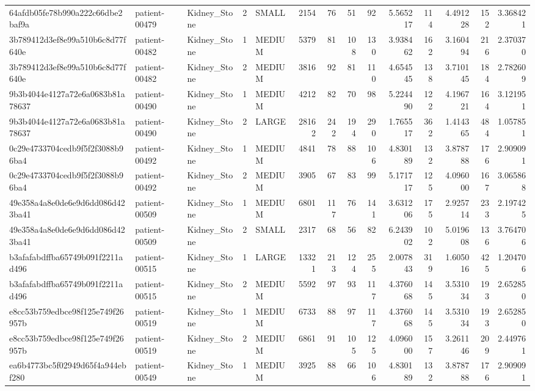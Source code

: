 \begin{tabular}{lllrlrrrrrrrrr}
64afdb05fe78b990a222c66dbe2baf9a & patient-00479 & Kidney_Stone & 2 & SMALL & 2154 & 76 & 51 & 92 & 5.565217 & 114 & 4.491228 & 152 & 3.368421 \\
3b789412d3ef8e99a510b6c8d77f640e & patient-00482 & Kidney_Stone & 1 & MEDIUM & 5379 & 81 & 108 & 130 & 3.938462 & 162 & 3.160494 & 216 & 2.370370 \\
3b789412d3ef8e99a510b6c8d77f640e & patient-00482 & Kidney_Stone & 2 & MEDIUM & 3816 & 92 & 81 & 110 & 4.654545 & 138 & 3.710145 & 184 & 2.782609 \\
9b3b4044e4127a72e6a0683b81a78637 & patient-00490 & Kidney_Stone & 1 & MEDIUM & 4212 & 82 & 70 & 98 & 5.224490 & 122 & 4.196721 & 164 & 3.121951 \\
9b3b4044e4127a72e6a0683b81a78637 & patient-00490 & Kidney_Stone & 2 & LARGE & 28162 & 242 & 194 & 290 & 1.765517 & 362 & 1.414365 & 484 & 1.057851 \\
0c29e4733704cedb9f5f2f3088b96ba4 & patient-00492 & Kidney_Stone & 1 & MEDIUM & 4841 & 78 & 88 & 106 & 4.830189 & 132 & 3.878788 & 176 & 2.909091 \\
0c29e4733704cedb9f5f2f3088b96ba4 & patient-00492 & Kidney_Stone & 2 & MEDIUM & 3905 & 67 & 83 & 99 & 5.171717 & 125 & 4.096000 & 167 & 3.065868 \\
49e358a4a8e0de6e9d6dd086d423ba41 & patient-00509 & Kidney_Stone & 1 & MEDIUM & 6801 & 117 & 76 & 141 & 3.631206 & 175 & 2.925714 & 233 & 2.197425 \\
49e358a4a8e0de6e9d6dd086d423ba41 & patient-00509 & Kidney_Stone & 2 & SMALL & 2317 & 68 & 56 & 82 & 6.243902 & 102 & 5.019608 & 136 & 3.764706 \\
b3afafabdffba65749b091f2211ad496 & patient-00515 & Kidney_Stone & 1 & LARGE & 13321 & 213 & 124 & 255 & 2.007843 & 319 & 1.605016 & 425 & 1.204706 \\
b3afafabdffba65749b091f2211ad496 & patient-00515 & Kidney_Stone & 2 & MEDIUM & 5592 & 97 & 93 & 117 & 4.376068 & 145 & 3.531034 & 193 & 2.652850 \\
e8cc53b759edbce98f125e749f26957b & patient-00519 & Kidney_Stone & 1 & MEDIUM & 6733 & 88 & 97 & 117 & 4.376068 & 145 & 3.531034 & 193 & 2.652850 \\
e8cc53b759edbce98f125e749f26957b & patient-00519 & Kidney_Stone & 2 & MEDIUM & 6861 & 91 & 105 & 125 & 4.096000 & 157 & 3.261146 & 209 & 2.449761 \\
ea6b4773bc5f02949d65f4a944ebf280 & patient-00549 & Kidney_Stone & 1 & MEDIUM & 3925 & 88 & 66 & 106 & 4.830189 & 132 & 3.878788 & 176 & 2.909091 \\

\end{tabular}
